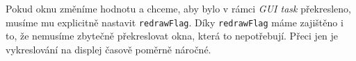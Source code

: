 Pokud oknu změníme hodnotu a chceme, aby bylo v rámci \emph{GUI task} překresleno, musíme mu explicitně
nastavit \texttt{redrawFlag}.
Díky \texttt{redrawFlag} máme zajištěno i to, že nemusíme zbytečně překreslovat okna, která to nepotřebují.
Přeci jen je vykreslování na displej časově poměrně náročné.

